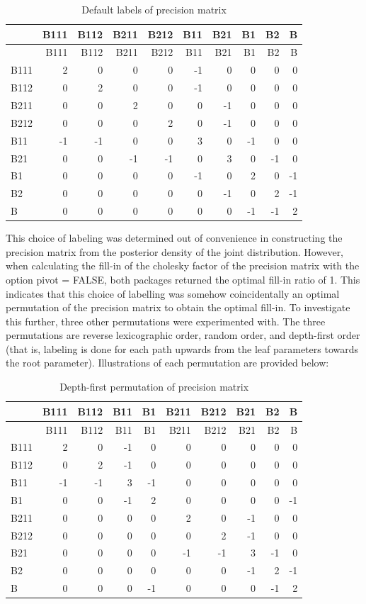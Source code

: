 \documentclass[]{article}
\begin{document}
\begin{longtable}[]{@{}lrrrrrrrrr@{}}
\caption{Default labels of precision matrix}\tabularnewline
\toprule
& B111 & B112 & B211 & B212 & B11 & B21 & B1 & B2 & B\tabularnewline
\midrule
\endfirsthead
\toprule
& B111 & B112 & B211 & B212 & B11 & B21 & B1 & B2 & B\tabularnewline
\midrule
\endhead
B111 & 2 & 0 & 0 & 0 & -1 & 0 & 0 & 0 & 0\tabularnewline
B112 & 0 & 2 & 0 & 0 & -1 & 0 & 0 & 0 & 0\tabularnewline
B211 & 0 & 0 & 2 & 0 & 0 & -1 & 0 & 0 & 0\tabularnewline
B212 & 0 & 0 & 0 & 2 & 0 & -1 & 0 & 0 & 0\tabularnewline
B11 & -1 & -1 & 0 & 0 & 3 & 0 & -1 & 0 & 0\tabularnewline
B21 & 0 & 0 & -1 & -1 & 0 & 3 & 0 & -1 & 0\tabularnewline
B1 & 0 & 0 & 0 & 0 & -1 & 0 & 2 & 0 & -1\tabularnewline
B2 & 0 & 0 & 0 & 0 & 0 & -1 & 0 & 2 & -1\tabularnewline
B & 0 & 0 & 0 & 0 & 0 & 0 & -1 & -1 & 2\tabularnewline
\bottomrule
\end{longtable}

This choice of labeling was determined out of convenience in
constructing the precision matrix from the posterior density of the
joint distribution. However, when calculating the fill-in of the
cholesky factor of the precision matrix with the option pivot = FALSE,
both packages returned the optimal fill-in ratio of 1. This indicates
that this choice of labelling was somehow coincidentally an optimal
permutation of the precision matrix to obtain the optimal fill-in. To
investigate this further, three other permutations were experimented
with. The three permutations are reverse lexicographic order, random
order, and depth-first order (that is, labeling is done for each path
upwards from the leaf parameters towards the root parameter).
Illustrations of each permutation are provided below:

\begin{longtable}[]{@{}lrrrrrrrrr@{}}
\caption{Depth-first permutation of precision matrix}\tabularnewline
\toprule
& B111 & B112 & B11 & B1 & B211 & B212 & B21 & B2 & B\tabularnewline
\midrule
\endfirsthead
\toprule
& B111 & B112 & B11 & B1 & B211 & B212 & B21 & B2 & B\tabularnewline
\midrule
\endhead
B111 & 2 & 0 & -1 & 0 & 0 & 0 & 0 & 0 & 0\tabularnewline
B112 & 0 & 2 & -1 & 0 & 0 & 0 & 0 & 0 & 0\tabularnewline
B11 & -1 & -1 & 3 & -1 & 0 & 0 & 0 & 0 & 0\tabularnewline
B1 & 0 & 0 & -1 & 2 & 0 & 0 & 0 & 0 & -1\tabularnewline
B211 & 0 & 0 & 0 & 0 & 2 & 0 & -1 & 0 & 0\tabularnewline
B212 & 0 & 0 & 0 & 0 & 0 & 2 & -1 & 0 & 0\tabularnewline
B21 & 0 & 0 & 0 & 0 & -1 & -1 & 3 & -1 & 0\tabularnewline
B2 & 0 & 0 & 0 & 0 & 0 & 0 & -1 & 2 & -1\tabularnewline
B & 0 & 0 & 0 & -1 & 0 & 0 & 0 & -1 & 2\tabularnewline
\bottomrule
\end{longtable}
\end{document}
